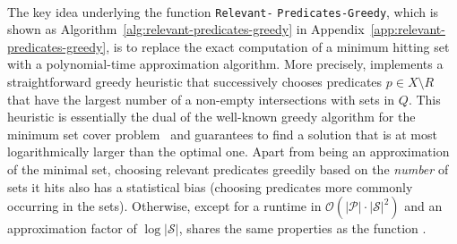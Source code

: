 \paragraph*{\protect{\RelevantPredicatesGreedy}}
The key idea underlying the function \texttt{Relevant-} \texttt{Predicates-Greedy}, which is shown as Algorithm~\ref{alg:relevant-predicates-greedy} in Appendix~\ref{app:relevant-predicates-greedy}, is to replace the exact computation of a minimum hitting set with a polynomial-time approximation algorithm.
More precisely, \RelevantPredicatesGreedy implements a straightforward greedy heuristic that successively chooses predicates $p \in X \setminus R$ that have the largest number of a non-empty intersections with  sets in $Q$.
This heuristic is essentially the dual of the well-known greedy algorithm for the minimum set cover problem~\cite{DBLP:journals/mor/Chvatal79} and guarantees to find a solution that is at most logarithmically larger than the optimal one.
Apart from being an approximation of the minimal set, choosing relevant predicates greedily based on the \emph{number} of sets it hits also has a statistical bias (choosing predicates more commonly occurring in the sets). 
Otherwise, except for a runtime in $\mathcal O(|\mathcal P| \cdot |\mathcal S|^2)$ and an approximation factor of $\log{|\mathcal S|}$, \RelevantPredicatesGreedy shares the same properties as the function \RelevantPredicatesMin.
